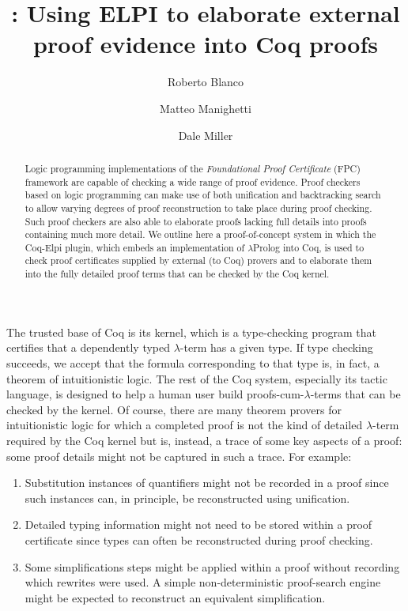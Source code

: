\documentclass[a4paper]{easychair}
\title{\fpccoq: Using ELPI to elaborate external proof evidence into Coq proofs}
\author{Roberto Blanco\inst{1}\and Matteo Manighetti\inst{2}\and Dale Miller\inst{2}}
\institute{Inria Paris\and Inria Saclay}
\newcommand{\lP}{$\lambda$Prolog\xspace}
\begin{document}
\maketitle
\begin{abstract}\noindent
Logic programming implementations of the \emph{Foundational Proof
  Certificate} (FPC) framework are capable of checking a wide range of
proof evidence.  Proof checkers based on logic programming can make
use of both unification and backtracking search to allow varying
degrees of proof reconstruction to take place during proof checking.
Such proof checkers are also able to elaborate proofs lacking full
details into proofs containing much more detail.  We outline here a
proof-of-concept system in which the Coq-Elpi plugin, which embeds an
implementation of \lP into Coq, is used to check proof certificates
supplied by external (to Coq) provers and to elaborate them into the
fully detailed proof terms that can be checked by the Coq kernel.
\end{abstract}

The trusted base of Coq is its kernel, which is a type-checking
program that certifies that a dependently typed $\lambda$-term has a
given type.  If type checking succeeds, we accept that the formula
corresponding to that type is, in fact, a theorem of intuitionistic
logic.  The rest of the Coq system, especially its tactic language, is
designed to help a human user build proofs-cum-$\lambda$-terms that
can be checked by the kernel.  Of course, there are many theorem
provers for intuitionistic logic for which a completed proof is not
the kind of detailed $\lambda$-term required by the Coq kernel but is,
instead, a trace of some key aspects of a proof: some proof details
might not be captured in such a trace.  For example:
\begin{enumerate}

\item Substitution instances of quantifiers might not be recorded in a
  proof since such instances can, in principle, be reconstructed using
  unification.

\item Detailed typing information might not need to be stored within a
  proof certificate since types can often be reconstructed during
  proof checking.

\item Some simplifications steps might be applied within a proof
  without recording which rewrites were used.  A simple 
  non-deterministic proof-search engine might be expected to
  reconstruct an equivalent simplification.
\end{enumerate}
\end{document}
